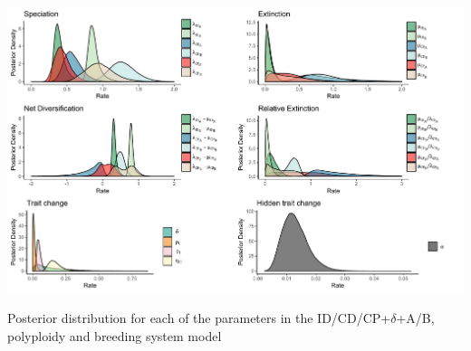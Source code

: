 
\begin{suppfigure}
\includegraphics[width=\textwidth]{muhisseDPSIposteriordist.pdf}
\caption{Posterior distribution for each of the parameters in the ID/CD/CP+$\delta$+A/B, polyploidy and breeding system model} %
\label{suppfigure:IDCDCPAB}
\end{suppfigure}

